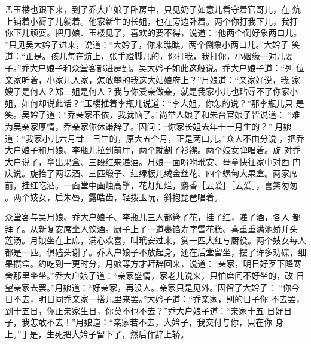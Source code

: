 孟玉楼也跟下来，到了乔大户娘子卧房中，只见奶子如意儿看守着官哥儿，在
炕上铺着小褥子儿躺着。他家新生的长姐，也在旁边卧着。两个你打我下儿，我打
你下儿顽耍。把月娘、玉楼见了，喜欢的要不得，说道：“他两个倒好象两口儿。
”只见吴大妗子进来，说道：“大妗子，你来瞧瞧，两个倒象小两口儿。”大妗子
笑道：“正是。孩儿每在炕上，张手蹬脚儿的，你打我，我打你，小姻缘一对儿耍
子。”乔大户娘子和众堂客都进房到。吴大妗子如此这般说。乔大户娘子道：“列
位亲家听着，小家儿人家，怎敢攀的我这大姑娘府上？”月娘道：“亲家好说，我
家嫂子是何人？郑三姐是何人？我与你爱亲做亲，就是我家小儿也玷辱不了你家小
姐，如何却说此话？”玉楼推着李瓶儿说道：“李大姐，你怎的说？”那李瓶儿只
是笑。吴妗子道：“乔亲家不依，我就恼了。”尚举人娘子和朱台官娘子皆说道：
“难为吴亲家厚情，乔亲家你休谦辞了。”因问：“你家长姐去年十一月生的？”
月娘道：“我家小儿六月廿三日生的，原大五个月，正是两口儿。”众人不由分说
，把乔大户娘子和月娘、李瓶儿拉到前厅，两个就割了衫襟。两个妓女弹唱着。旋
对乔大户说了，拿出果盒、三段红来递酒。月娘一面吩咐玳安、琴童快往家中对西
门庆说。旋抬了两坛酒、三匹缎子、红绿板儿绒金丝花、四个螺甸大果盒。两家席
前，挂红吃酒。一面堂中画烛高擎，花灯灿烂，麝香［云爱］［云爱］，喜笑匆匆
。两个妓女，启朱唇，露皓齿，轻拨玉阮，斜抱琵琶唱着。

众堂客与吴月娘、乔大户娘子、李瓶儿三人都簪了花，挂了红，递了酒，各人
都拜了。从新复安席坐人饮酒。厨子上了一道裹馅寿字雪花糕、喜重重满池娇并头
莲汤。月娘坐在上席，满心欢喜，叫玳安过来，赏一匹大红与厨役。两个妓女每人
都是一匹。俱磕头谢了。乔大户娘子不放起身，还在后堂留坐，摆了许多劝碟，细
果攒盒。约吃到一更时分，月娘等方才拜辞回来，说道：“亲家，明日好歹下降寒
舍那里坐坐。”乔大户娘子道：“亲家盛情，家老儿说来，只怕席间不好坐的，改
日望亲家去罢。”月娘道：“好亲家，再没人。亲家只是见外。”因留了大妗子：
“你今日不去，明日同乔亲家一搭儿里来罢。”大妗子道：“乔亲家，别的日子你
不去罢，到十五日，你正亲家生日，你莫不也不去？”乔大户娘子道：“亲家十五
日好日子，我怎敢不去！”月娘道：“亲家若不去，大妗子，我交付与你，只在你
身上。”于是，生死把大妗子留下了，然后作辞上轿。

